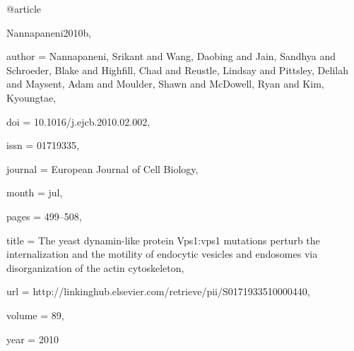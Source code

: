 @article{Nannapaneni2010b,

author = {Nannapaneni, Srikant and Wang, Daobing and Jain, Sandhya and Schroeder, Blake and Highfill, Chad and Reustle, Lindsay and Pittsley, Delilah and Maysent, Adam and Moulder, Shawn and McDowell, Ryan and Kim, Kyoungtae},

doi = {10.1016/j.ejcb.2010.02.002},

issn = {01719335},

journal = {European Journal of Cell Biology},

month = {jul},

pages = {499--508},

title = {{The yeast dynamin-like protein Vps1:vps1 mutations perturb the internalization and the motility of endocytic vesicles and endosomes via disorganization of the actin cytoskeleton}},

url = {http://linkinghub.elsevier.com/retrieve/pii/S0171933510000440},

volume = {89},

year = {2010}

}

